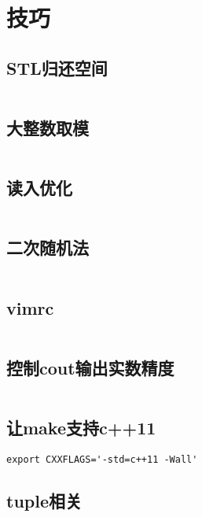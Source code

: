 \chapter{技巧}
\section{STL归还空间}
\inputminted{cpp}{\source/tricks/truly-release-container-space.cpp}
\section{大整数取模}
\inputminted{cpp}{\source/tricks/O1-multiply-mod.cpp}
\section{读入优化}
\inputminted{cpp}{\source/tricks/unbeatable-input-acceleration.cpp}
\section{二次随机法}
\inputminted{cpp}{\source/tricks/mersenne-twister.cpp}
\section{vimrc}
\inputminted{cpp}{\source/tricks/vimrc}
\section{控制cout输出实数精度}
\inputminted{cpp}{\source/tricks/control-cout-precision.cpp}
\section{让make支持c++11}
\begin{verbatim}
export CXXFLAGS='-std=c++11 -Wall'
\end{verbatim}
\section{tuple相关}
\inputminted{cpp}{\source/tricks/tuple.cpp}
